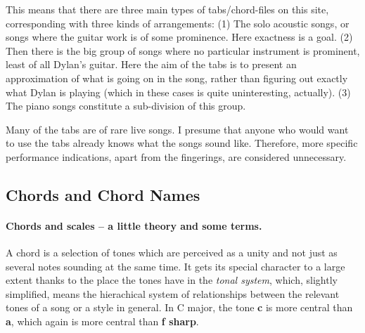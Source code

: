 \begin{articlelayout}
This means that there are three main types of tabs/chord-files on this
site, corresponding with three kinds of arrangements: (1) The solo
acoustic songs, or songs where the guitar work is of some
prominence. Here exactness is a goal. (2) Then there is the big group
of songs where no particular instrument is prominent, least of all
Dylan's guitar. Here the aim of the tabs is to present an
approximation of what is going on in the song, rather than figuring
out exactly what Dylan is playing (which in these cases is quite
uninteresting, actually). (3) The piano songs constitute a
sub-division of this group.

Many of the tabs are of rare live songs. I presume that anyone who
would want to use the tabs already knows what the songs sound
like. Therefore, more specific performance indications, apart from the
fingerings, are considered unnecessary.

\subsection*{Chords and Chord Names}

\paragraph*{Chords and scales -- a little theory and some terms.} A
chord is a selection of tones which are perceived as a unity and not
just as several notes sounding at the same time. It gets its special
character to a large extent thanks to the place the tones have in the
\emph{tonal system}, which, slightly simplified, means the hierachical
system of relationships between the relevant tones of a song or a
style in general. In C major, the tone \textbf{c} is more central than
\textbf{a}, which again is more central than \textbf{f sharp}.


\end{articlelayout}
